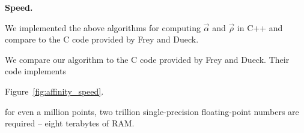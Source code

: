 \documentclass{article}
\newtheorem{theorem}{Theorem}
\newtheorem{definition} {Definition}
\newcommand{\GNP}[1][\psi]{{#1}_{\Theta}}
\DeclareMathOperator{\op}{op}
\newcommand{\fig}[1]{Figure~\ref{fig:#1}}
\newcommand{\vecrho}{\vec{\rho}}
\newcommand{\vecalpha}{\vec{\alpha}}
\begin{document}
{\bf Speed.}

We implemented the above algorithms for computing $\vecalpha$ and $\vecrho$ in C++ and compare to the C code provided by Frey and Dueck.


We compare our algorithm to the C code provided by Frey and Dueck\cite{frey_dueck_code}.
Their code implements 

\fig{affinity_speed}.


 for even a million points, two trillion single-precision floating-point numbers are required -- eight terabytes of RAM.


\appendix

% 
% 
% 
\end{document}
